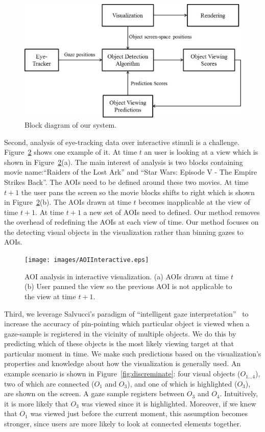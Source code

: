 \begin{figure}[htb]
  \centering
  \includegraphics[width=\linewidth]{images/systemBlockDiagram.eps}
  \caption{Block diagram of our system.}
	\label{fig:systemBlockDiagram}
\end{figure}

Second, analysis of eye-tracking data over interactive stimuli is a challenge. Figure~\ref{fig:AOIInteractive} shows one example of it. At time $t$ an user is looking at a view which is shown in Figure~\ref{fig:AOIInteractive}(a). The main interest of analysis is two blocks containing movie name:``Raiders of the Lost Ark'' and ``Star Wars: Episode V - The Empire Strikes Back''. The AOIs need to be defined around these two movies. At time $t+1$ the user pans the screen so the movie blocks shifts to right which is shown in Figure~\ref{fig:AOIInteractive}(b). The AOIs drawn at time $t$ becomes inapplicable at the view of time $t+1$. At time $t+1$ a new set of AOIs need to defined. Our method removes the overhead of redefining the AOIs at each view of time. Our method focuses on the detecting visual objects in the visualization rather than binning gazes to AOIs.

\begin{figure}[htb]
  \centering
  \texttt{[image: images/AOIInteractive.eps]}
  \caption{AOI analysis in interactive visualization. (a) AOIs drawn at time $t$ (b) User panned the view so the previous AOI is not applicable to the view at time $t+1$.}
	\label{fig:AOIInteractive}
\end{figure}

Third, we leverage Salvucci's paradigm of ``intelligent gaze interpretation''~\cite{salvucci2000intelligent} to increase the accuracy of pin-pointing which particular object is viewed when a gaze-sample is registered in the vicinity of multiple objects. We do this by predicting which of these objects is the most likely viewing target at that particular moment in time. We make such predictions based on the visualization's properties and knowledge about how the visualization is generally used. An example scenario is shown in Figure~\ref{fig:discreminate}: four visual objects ($O_{1\ldots 4}$), two of which are connected ($O_1$ and $O_3$), and one of which is highlighted ($O_3$), are shown on the screen. A gaze sample registers between $O_3$ and $O_4$. Intuitively, it is more likely that $O_3$ was viewed since it is highlighted. Moreover, if we knew that $O_1$ was viewed just before the current moment, this assumption becomes stronger, since users are more likely to look at connected elements together. 

